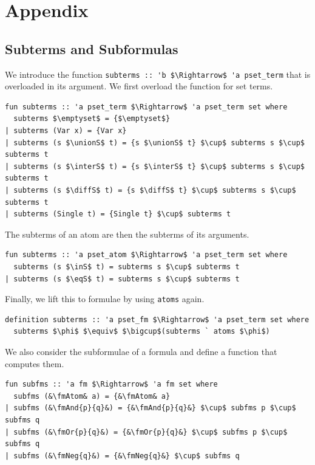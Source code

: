 \documentclass[runningheads]{llncs}
\newcommand{\unionS}{\sqcup_\text{s}}
\newcommand{\interS}{\sqcap_\text{s}}
\newcommand{\diffS}{-_\text{s}}
\newcommand{\inS}{\in_\text{s}}
\newcommand{\eqS}{=_\text{s}}
\newcommand{\fmAndSymbol}{\boldsymbol{\land}}
\newcommand{\fmAnd}[2]{#1 $\fmAndSymbol$ #2}
\newcommand{\fmOr}[2]{#1 $\boldsymbol{\lor}$ #2}
\newcommand{\fmNegSymbol}{\boldsymbol{\neg}}
\newcommand{\fmNeg}[1]{$\fmNegSymbol\:$#1}
\newcommand{\fmAtom}{\textbf{A}}
\begin{document}



\appendix

\clearpage\chapter*{Appendix}
\section{Subterms and Subformulas\label{appendix:subterms}}

We introduce the function \lstinline!subterms :: 'b $\Rightarrow$ 'a pset_term! that is overloaded in its argument.
We first overload the function for set terms.
\begin{lstlisting}
fun subterms :: 'a pset_term $\Rightarrow$ 'a pset_term set where
  subterms $\emptyset$ = {$\emptyset$}
| subterms (Var x) = {Var x}
| subterms (s $\unionS$ t) = {s $\unionS$ t} $\cup$ subterms s $\cup$ subterms t
| subterms (s $\interS$ t) = {s $\interS$ t} $\cup$ subterms s $\cup$ subterms t
| subterms (s $\diffS$ t) = {s $\diffS$ t} $\cup$ subterms s $\cup$ subterms t
| subterms (Single t) = {Single t} $\cup$ subterms t
\end{lstlisting}
The subterms of an atom are then the subterms of its arguments.
\begin{lstlisting}
fun subterms :: 'a pset_atom $\Rightarrow$ 'a pset_term set where
  subterms (s $\inS$ t) = subterms s $\cup$ subterms t
| subterms (s $\eqS$ t) = subterms s $\cup$ subterms t
\end{lstlisting}
Finally, we lift this to formulae by using \lstinline!atoms! again.
\begin{lstlisting}
definition subterms :: 'a pset_fm $\Rightarrow$ 'a pset_term set where
  subterms $\phi$ $\equiv$ $\bigcup$(subterms ` atoms $\phi$)
\end{lstlisting}

We also consider the subformulae of a formula and define a function that computes them.
\begin{lstlisting}
fun subfms :: 'a fm $\Rightarrow$ 'a fm set where
  subfms (&\fmAtom& a) = {&\fmAtom& a}
| subfms (&\fmAnd{p}{q}&) = {&\fmAnd{p}{q}&} $\cup$ subfms p $\cup$ subfms q
| subfms (&\fmOr{p}{q}&) = {&\fmOr{p}{q}&} $\cup$ subfms p $\cup$ subfms q
| subfms (&\fmNeg{q}&) = {&\fmNeg{q}&} $\cup$ subfms q
\end{lstlisting}
\end{document}
